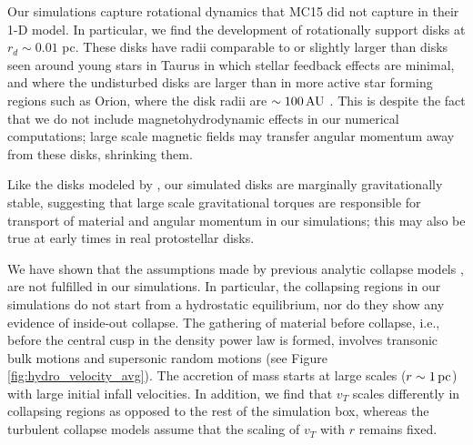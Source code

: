\documentclass[../dissertation.tex]{subfiles}
\begin{document}
Our simulations capture rotational dynamics that MC15 did not capture in their 1-D model.  
In particular, we find the development of rotationally support disks at $r_d \sim 0.01$ pc.  
These disks have radii comparable to  or slightly larger than disks seen around 
young stars in Taurus \citep{1999AJ....117.1490P} in which stellar feedback effects are minimal,
and where the undisturbed disks are larger than in more active star forming regions such as Orion, 
where the disk radii are $\sim 100\,\rm AU$ \citep{2011ARA&A..49...67W}.  
This is despite the fact that we do not include magnetohydrodynamic effects 
in our numerical computations;  large scale magnetic fields may transfer angular 
momentum away from these disks, shrinking them.  

Like the disks modeled by \citet{2010ApJ...708.1585K},
our simulated disks are 
marginally gravitationally stable, suggesting that large scale gravitational torques are 
responsible for transport of material and angular momentum in our simulations; this may
also be true at early times in real protostellar disks.  

We have shown that the assumptions made by previous analytic collapse models
\citep{1977ApJ...214..488S,1992ApJ...396..631M,1997ApJ...476..750M,2003ApJ...585..850M}, 
are not fulfilled in our simulations.  In particular, 
the collapsing regions in our simulations do not start from a hydrostatic equilibrium, nor 
do they show any evidence of inside-out collapse.  The gathering of material before collapse, i.e.,
before the central cusp in the density power law is formed, involves transonic bulk motions 
and supersonic random motions (see Figure \ref{fig:hydro_velocity_avg}). The accretion of mass starts at large 
scales ($r\sim 1\,\rm pc$) with large initial infall velocities.  In addition, we find that $v_T$ 
scales differently in collapsing regions as opposed to the rest of the simulation box, 
whereas the turbulent collapse models \citep{1997ApJ...476..750M,2003ApJ...585..850M} assume 
that the scaling of $v_T$ with $r$ remains fixed.  

\end{document}
